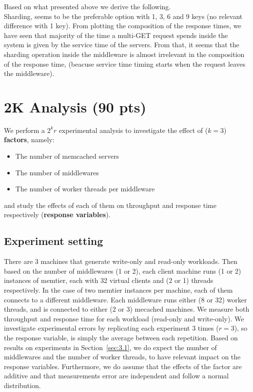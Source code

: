 \documentclass[11pt,a4paper]{article}
\begin{document}
Based on what presented above we derive the following. \\
Sharding, seems to be the preferable option with 1, 3, 6 and 9 keys (no relevant difference with 1 key).
From plotting the composition of the response times, we have seen that majority of the time a multi-GET request spends inside the system is given by the service time of the servers.
From that, it seems that the sharding operation inside the middleware is almost irrelevant in the composition of the response time, (beacuse service time timing starts when the request leaves the middleware).

\section{2K Analysis (90 pts)}

We perform a $2^kr$ experimental analysis to investigate the effect of ($k=3$) \textbf{factors}, namely:

\begin{itemize}
    \item The number of memcached servers
    \item The number of middlewares
    \item The number of worker threads per middleware
\end{itemize}

and study the effects of each of them on throughput and response time respectively (\textbf{response variables}).

\subsection{Experiment setting}

There are 3 machines that generate write-only and read-only workloads. Then based on the number of middlewares (1 or 2), each client machine runs (1 or 2) instances of memtier, each with 32 virtual clients and (2 or 1) threads respectively. In the case of two memtier instances per machine, each of them connects to a different middleware. 
Each middleware runs either (8 or 32) worker threads, and is connected to either (2 or 3) mecached machines. We measure both throughput and response time for each workload (read-only and write-only).
We investigate experimental errors by replicating each experiment 3 times ($r=3$), so the response variable, is simply the average between each repetition.
Based on results on experiments in Section~\ref{sec:3.1}, we do expect the number of middlewares and the number of worker threads, to have relevant impact on the response variables. Furthermore, we do assume that the effects of the factor are additive and that measurements error are independent and follow a normal distribution.\\
\end{document}
